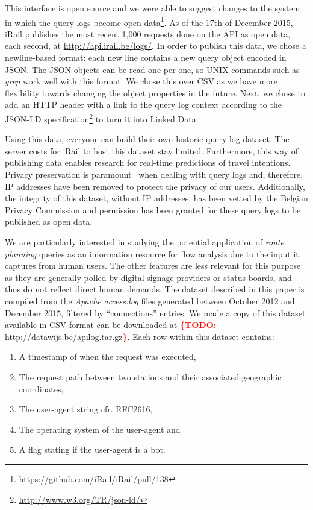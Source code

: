 \documentclass{sig-alternate}
\newcommand{\todo}[1]{\noindent\textcolor{red}{{\bf \{TODO}: #1{\bf \}}}}
\begin{document}
This interface is open source and we were able to suggest changes to the system in which the query logs become open data\footnote{\url{https://github.com/iRail/iRail/pull/138}}.
As of the 17th of December 2015, iRail publishes the most recent 1,000 requests done on the API as open data, each second, at \url{http://api.irail.be/logs/}.
In order to publish this data, we chose a newline-based format: each new line contains a new query object encoded in JSON. 
The JSON objects can be read one per one, so UNIX commands such as \emph{grep} work well with this format.
We chose this over CSV as we have more flexibility towards changing the object properties in the future.
Next, we chose to add an HTTP header with a link to the query log context according to the JSON-LD specification\footnote{\url{http://www.w3.org/TR/json-ld/}} to turn it into Linked Data.

Using this data, everyone can build their own historic query log dataset.
The server costs for iRail to host this dataset stay limited.
Furthermore, this way of publishing data enables research for real-time predictions of travel intentions.
Privacy preservation is paramount~\cite{silvestri} when dealing with query logs and, therefore, IP addresses have been removed to protect the privacy of our users. 
Additionally, the integrity of this dataset, without IP addresses, has been vetted by the Belgian Privacy Commission and permission has been granted for these query logs to be published as open data.

We are particularly interested in studying the potential application of \emph{route planning} queries as an information resource for flow analysis due to the input it captures from human users.
The other features are less relevant for this purpose as they are generally polled by digital signage providers or status boards, and thus do not reflect direct human demands.
The dataset described in this paper is compiled from the \emph{Apache} \emph{access.log} files generated between October 2012 and December 2015, filtered by ``connections'' entries.
We made a copy of this dataset available in CSV format can be downloaded at \todo{\url{http://datawijs.be/apilog.tar.gz}}.
Each row within this dataset contains:
\begin{enumerate}
\item A timestamp of when the request was executed,
\item The request path between two stations and their associated geographic coordinates,
\item The user-agent string cfr. RFC2616,
\item The operating system of the user-agent and
\item A flag stating if the user-agent is a bot.
\end{enumerate}
\end{document}
